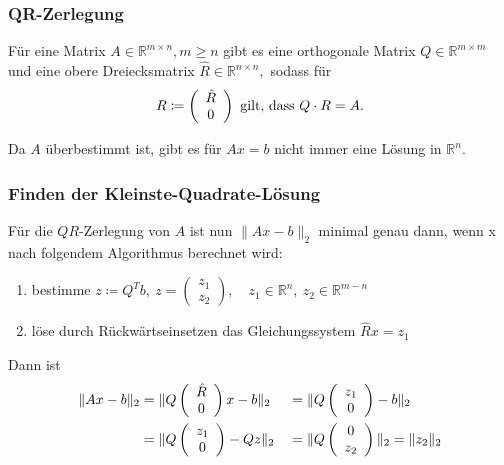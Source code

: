 \documentclass[a4paper, 11pt]{beamer}
\begin{document}
\begin{frame}
    \frametitle{QR-Zerlegung}
    Für eine Matrix $A \in \mathbb{R}^{m \times n}, m \geq n$ gibt es eine orthogonale Matrix $Q \in \mathbb{R}^{m \times m}$ und eine obere Dreiecksmatrix $\hat{R} \in \mathbb{R}^{n \times n},$ sodass für
    $$ R \coloneqq \left( \begin{array}{c} \hat{R}\\ 0 \end{array} \right) \text{ gilt, dass } Q \cdot R = A. $$

    Da $A$ überbestimmt ist, gibt es für $Ax = b$ nicht immer eine Lösung in $\mathbb{R}^n.$\\
    \vspace{0.40cm}
\end{frame}

\begin{frame}
    \frametitle{Finden der Kleinste-Quadrate-Lösung}

    Für die $QR$-Zerlegung von $A$ ist nun $\| Ax-b \|_2$ minimal genau dann, wenn x nach folgendem Algorithmus berechnet wird:

    \begin{enumerate}
        \item bestimme $z \coloneqq Q^T b,\ z = \left( \begin{array}{r} z_1 \\ z_2 \end{array} \right), \quad z_1 \in \mathbb{R}^n,\ z_2 \in \mathbb{R}^{m-n}$
        \item löse durch Rückwärtseinsetzen das Gleichungssystem $\hat{R}x = z_1$
    \end{enumerate}

    \newcommand{\zo}{\left( \begin{array}{c} z_1\\0 \end{array} \right)}
    \newcommand{\zO}{\left( \begin{array}{c} 0\\z_2 \end{array} \right)}

    Dann ist \begin{alignat*}{2}
        \| Ax-b \|_2 &= \| Q\R x-b \|_2 &&= \| Q \zo - b\|_2 \\
        &= \| Q \zo - Q z \|_2 &&= \| Q \zO \|_2 = \| z_2 \|_2
    \end{alignat*}
    
\end{frame}
\end{document}
